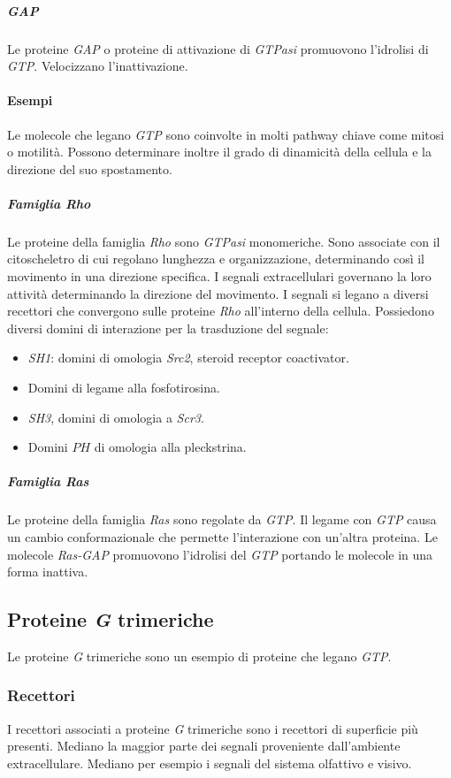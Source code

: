 				\subparagraph{\emph{GAP}}
				Le proteine \emph{GAP} o proteine di attivazione di \emph{GTPasi} promuovono l'idrolisi di \emph{GTP}.
				Velocizzano l'inattivazione.

			\paragraph{Esempi}
			Le molecole che legano \emph{GTP} sono coinvolte in molti pathway chiave come mitosi o motilit\`a.
			Possono determinare inoltre il grado di dinamicit\`a della cellula e la direzione del suo spostamento.

				\subparagraph{Famiglia \emph{Rho}}
				Le proteine della famiglia \emph{Rho} sono \emph{GTPasi} monomeriche.
				Sono associate con il citoscheletro di cui regolano lunghezza e organizzazione, determinando cos\`i il movimento in una direzione specifica.
				I segnali extracellulari governano la loro attivit\`a determinando la direzione del movimento.
				I segnali si legano a diversi recettori che convergono sulle proteine \emph{Rho} all'interno della cellula.
				Possiedono diversi domini di interazione per la trasduzione del segnale:
				\begin{multicols}{2}
					\begin{itemize}
						\item \emph{SH1}: domini di omologia \emph{Src2}, steroid receptor coactivator.
						\item Domini di legame alla fosfotirosina.
						\item \emph{SH3}, domini di omologia a \emph{Scr3}.
						\item Domini $PH$ di omologia alla pleckstrina.
					\end{itemize}
				\end{multicols}

				\subparagraph{Famiglia \emph{Ras}}
				Le proteine della famiglia \emph{Ras} sono regolate da \emph{GTP}.
				Il legame con \emph{GTP} causa un cambio conformazionale che permette l'interazione con un'altra proteina.
				Le molecole \emph{Ras-GAP} promuovono l'idrolisi del \emph{GTP} portando le molecole in una forma inattiva.

	\subsection{Proteine \emph{G} trimeriche}
	Le proteine \emph{G} trimeriche sono un esempio di proteine che legano \emph{GTP}.

		\subsubsection{Recettori}
		I recettori associati a proteine \emph{G} trimeriche sono i recettori di superficie pi\`u presenti.
		Mediano la maggior parte dei segnali proveniente dall'ambiente extracellulare.
		Mediano per esempio i segnali del sistema olfattivo e visivo.

